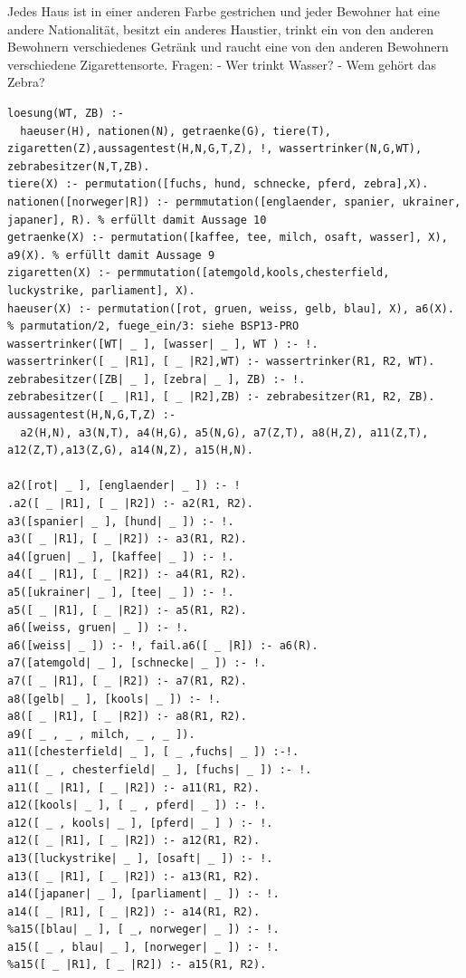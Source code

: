 \documentclass[a4paper]{article}
\begin{document}
\begin{multicols}{3}
  Jedes Haus ist in einer anderen Farbe gestrichen und jeder Bewohner hat
  eine andere Nationalität, besitzt ein anderes Haustier, trinkt ein von
  den anderen Bewohnern verschiedenes Getränk und raucht eine von den
  anderen Bewohnern verschiedene Zigarettensorte. Fragen: - Wer trinkt
  Wasser? - Wem gehört das Zebra?

  \begin{verbatim}
loesung(WT, ZB) :-
  haeuser(H), nationen(N), getraenke(G), tiere(T), zigaretten(Z),aussagentest(H,N,G,T,Z), !, wassertrinker(N,G,WT), zebrabesitzer(N,T,ZB).
tiere(X) :- permutation([fuchs, hund, schnecke, pferd, zebra],X).
nationen([norweger|R]) :- permmutation([englaender, spanier, ukrainer, japaner], R). % erfüllt damit Aussage 10
getraenke(X) :- permutation([kaffee, tee, milch, osaft, wasser], X), a9(X). % erfüllt damit Aussage 9
zigaretten(X) :- permmutation([atemgold,kools,chesterfield, luckystrike, parliament], X).
haeuser(X) :- permutation([rot, gruen, weiss, gelb, blau], X), a6(X).
% parmutation/2, fuege_ein/3: siehe BSP13-PRO
wassertrinker([WT| _ ], [wasser| _ ], WT ) :- !.
wassertrinker([ _ |R1], [ _ |R2],WT) :- wassertrinker(R1, R2, WT).
zebrabesitzer([ZB| _ ], [zebra| _ ], ZB) :- !.
zebrabesitzer([ _ |R1], [ _ |R2],ZB) :- zebrabesitzer(R1, R2, ZB).
aussagentest(H,N,G,T,Z) :-
  a2(H,N), a3(N,T), a4(H,G), a5(N,G), a7(Z,T), a8(H,Z), a11(Z,T), a12(Z,T),a13(Z,G), a14(N,Z), a15(H,N).
  
a2([rot| _ ], [englaender| _ ]) :- !
.a2([ _ |R1], [ _ |R2]) :- a2(R1, R2).
a3([spanier| _ ], [hund| _ ]) :- !.
a3([ _ |R1], [ _ |R2]) :- a3(R1, R2).
a4([gruen| _ ], [kaffee| _ ]) :- !.
a4([ _ |R1], [ _ |R2]) :- a4(R1, R2).
a5([ukrainer| _ ], [tee| _ ]) :- !.
a5([ _ |R1], [ _ |R2]) :- a5(R1, R2).
a6([weiss, gruen| _ ]) :- !.
a6([weiss| _ ]) :- !, fail.a6([ _ |R]) :- a6(R).
a7([atemgold| _ ], [schnecke| _ ]) :- !.
a7([ _ |R1], [ _ |R2]) :- a7(R1, R2).
a8([gelb| _ ], [kools| _ ]) :- !.
a8([ _ |R1], [ _ |R2]) :- a8(R1, R2).
a9([ _ , _ , milch, _ , _ ]).
a11([chesterfield| _ ], [ _ ,fuchs| _ ]) :-!.
a11([ _ , chesterfield| _ ], [fuchs| _ ]) :- !.
a11([ _ |R1], [ _ |R2]) :- a11(R1, R2).
a12([kools| _ ], [ _ , pferd| _ ]) :- !.
a12([ _ , kools| _ ], [pferd| _ ] ) :- !.
a12([ _ |R1], [ _ |R2]) :- a12(R1, R2).
a13([luckystrike| _ ], [osaft| _ ]) :- !.
a13([ _ |R1], [ _ |R2]) :- a13(R1, R2).
a14([japaner| _ ], [parliament| _ ]) :- !.
a14([ _ |R1], [ _ |R2]) :- a14(R1, R2).
%a15([blau| _ ], [ _, norweger| _ ]) :- !.
a15([ _ , blau| _ ], [norweger| _ ]) :- !.
%a15([ _ |R1], [ _ |R2]) :- a15(R1, R2).


\end{verbatim}
\end{multicols}
\end{document}
